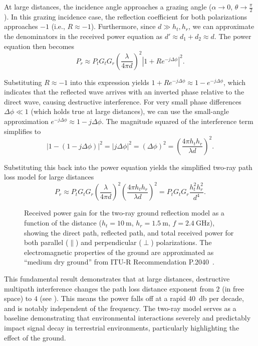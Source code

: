 At large distances, the incidence angle approaches a grazing angle ($\alpha \to 0$, $\theta \to \tfrac{\pi}{2}$). In this grazing incidence case, the reflection coefficient for both polarizations approaches $-1$ (i.e., $R \approx -1$). Furthermore, since $d \gg h_t, h_r$, we can approximate the denominators in the received power equation as $d' \approx d_1 + d_2 \approx d$. The power equation then becomes
\begin{equation}
  P_r \approx P_t G_t G_r \left( \frac{\lambda}{4\pi d} \right)^2 \left| 1 + R e^{-j\Delta \phi} \right|^2.
\end{equation}

Substituting $R \approx -1$ into this expression yields $1 + R e^{-j\Delta \phi} \approx 1 - e^{-j\Delta \phi}$, which indicates that the reflected wave arrives with an inverted phase relative to the direct wave, causing destructive interference. For very small phase differences $\Delta \phi \ll 1$ (which holds true at large distances), we can use the small-angle approximation $e^{-j\Delta \phi} \approx 1 - j\Delta \phi$. The magnitude squared of the interference term simplifies to
\begin{equation}
  \left| 1 - (1 - j\Delta \phi) \right|^2 = |j\Delta \phi|^2 = (\Delta \phi)^2 = \left( \frac{4\pi h_t h_r}{\lambda d} \right)^2.
\end{equation}

Substituting this back into the power equation yields the simplified two-ray path loss model for large distances
\begin{equation}\label{eq:two-ray-approx}
  P_r \approx P_t G_t G_r \left( \frac{\lambda}{4\pi d} \right)^2 \left( \frac{4\pi h_t h_r}{\lambda d} \right)^2 = P_t G_t G_r \frac{h_t^2 h_r^2}{d^4}.
\end{equation}

\begin{figure}
  \centering
  \caption{Received power gain for the two-ray ground reflection model as a function of the distance ($h_t = \qty{10}{\meter}$, $h_r = \qty{1.5}{\meter}$, $f = \qty{2.4}{\giga\hertz}$), showing the direct path, reflected path, and total received power for both parallel ($\parallel$) and perpendicular ($\perp$) polarizations. The electromagnetic properties of the ground are approximated as \enquote{medium dry ground} from ITU-R Recommendation P.2040~\cite[Tab.~3]{ITU-R-P.2040}.}
\end{figure}

This fundamental result demonstrates that at large distances, destructive multipath interference changes the path loss distance exponent from $2$ (in \gls{free space}) to $4$ (see ). This means the power falls off at a rapid \qty{40}{\decibel} per decade, and is notably independent of the frequency. The two-ray model serves as a baseline demonstrating that environmental interactions severely and predictably impact signal decay in terrestrial environments, particularly highlighting the effect of the ground.

